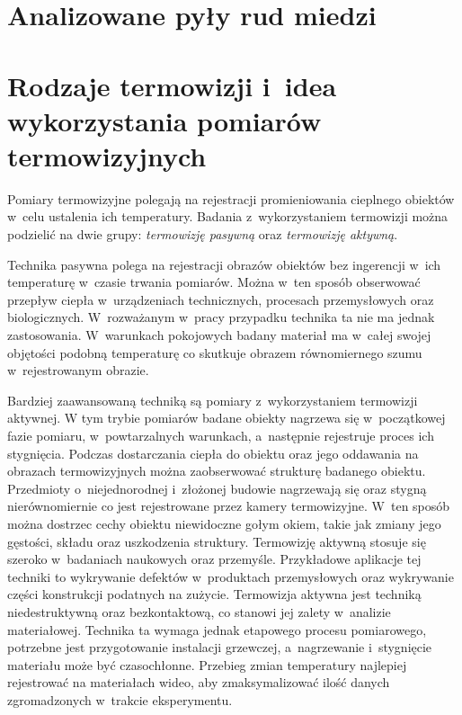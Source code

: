 \section{Analizowane pyły rud miedzi}

\section{Rodzaje termowizji i~idea wykorzystania pomiarów termowizyjnych}
Pomiary termowizyjne polegają na rejestracji promieniowania cieplnego obiektów
w~celu ustalenia ich temperatury.
Badania z~wykorzystaniem termowizji można podzielić na dwie grupy:
\emph{termowizję pasywną} oraz \emph{termowizję aktywną}.

Technika pasywna polega na rejestracji obrazów obiektów bez ingerencji w~ich
temperaturę w~czasie trwania pomiarów.
Można w~ten sposób obserwować przepływ ciepła w~urządzeniach technicznych,
procesach przemysłowych oraz biologicznych.
W~rozważanym w~pracy przypadku technika ta nie ma jednak zastosowania.
W~warunkach pokojowych badany materiał ma w~całej swojej objętości podobną
temperaturę co skutkuje obrazem równomiernego szumu w~rejestrowanym obrazie.

Bardziej zaawansowaną techniką są pomiary z~wykorzystaniem termowizji
aktywnej.
W tym trybie pomiarów badane obiekty nagrzewa się w~początkowej fazie pomiaru,
w~powtarzalnych warunkach, a~następnie rejestruje proces ich stygnięcia.
Podczas dostarczania ciepła do obiektu oraz jego oddawania na obrazach
termowizyjnych można zaobserwować strukturę badanego obiektu.
Przedmioty o~niejednorodnej i~złożonej budowie nagrzewają się oraz stygną
nierównomiernie co jest rejestrowane przez kamery termowizyjne.
W~ten sposób można dostrzec cechy obiektu niewidoczne gołym okiem, takie
jak zmiany jego gęstości, składu oraz uszkodzenia struktury.
Termowizję aktywną stosuje się szeroko w~badaniach naukowych oraz przemyśle.
Przykładowe aplikacje tej techniki to wykrywanie defektów w~produktach
przemysłowych oraz wykrywanie części konstrukcji podatnych na zużycie.
Termowizja aktywna jest techniką niedestruktywną oraz bezkontaktową,
co stanowi jej zalety w~analizie materiałowej.
Technika ta wymaga jednak etapowego procesu pomiarowego, potrzebne jest 
przygotowanie instalacji grzewczej, a~nagrzewanie i~stygnięcie materiału
może być czasochłonne.
Przebieg zmian temperatury najlepiej rejestrować na materiałach wideo,
aby zmaksymalizować ilość danych zgromadzonych w~trakcie eksperymentu.


